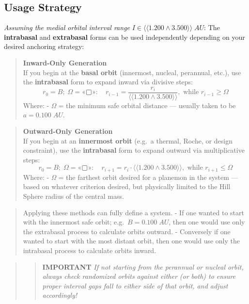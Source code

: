 \documentclass[
  letterpaper,
]{book}
\begin{document}
\subsection{Usage Strategy}\label{usage-strategy}

\emph{Assuming the medial orbital interval range}
\(I \in ⟨⟨1.200 ∧ 3.500⟩⟩\;AU\): The \textbf{intrabasal} and
\textbf{extrabasal} forms can be used independently depending on your
desired anchoring strategy:

\begin{quote}
\textbf{Inward-Only Generation}\\
If you begin at the \textbf{basal orbit} (innermost, nucleal, perannual,
etc.), use the \textbf{intrabasal} form to expand inward via divisive
steps: \[
r_0 = B;\; \Omega = «▢»:
\quad r_{i-1} = \dfrac{r_i} {⟨⟨1.200 ∧ 3.500⟩⟩}, \text{ while } r_{i-1} \geq \Omega
\] Where: - \emph{Ω} = the minimum safe orbital distance --- usually
taken to be \(a = 0.100\;AU\).
\end{quote}

\begin{quote}
\textbf{Outward-Only Generation}\\
If you begin at an \textbf{innermost orbit} (e.g.~a thermal, Roche, or
design constraint), use the \textbf{intrabasal} form to expand outward
via multiplicative steps: \[
r_0 = B;\; \Omega = «▢»:
\quad r_{i+1} = r_i \cdot ⟨⟨1.200 ∧ 3.500⟩⟩, \text{ while } r_{i+1} \leq \Omega
\] Where: - \emph{Ω} = the farthest orbit desired for a planemon in the
system --- based on whatever criterion desired, but physically limited
to the Hill Sphere radius of the central mass.
\end{quote}

\begin{quote}
Applying these methods can fully define a system. - If one wanted to
start with the innermost safe orbit; e.g.~\(B = 0.100\;AU\), then one
would use only the extrabasal process to calculate orbits outward. -
Conversely if one wanted to start with the most distant orbit, then one
would use only the intrabasal process to calculate orbits inward.
\end{quote}

\begin{quote}
\begin{quote}
\textbf{IMPORTANT} \emph{If not starting from the perannual or nucleal
orbit, always check randomized orbits against either (or both) to ensure
proper interval gaps fall to either side of that orbit, and adjust
accordingly!}
\end{quote}
\end{quote}
\end{document}
